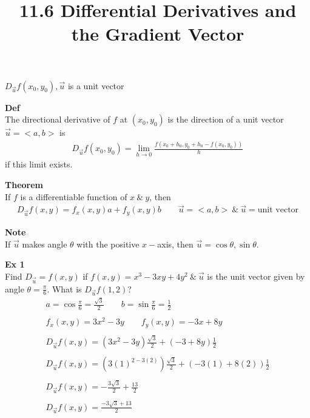 \documentclass{article}
\title{11.6 Differential Derivatives and the Gradient Vector}
\begin{document}
    \maketitle
    $ D_{\vec{u}} f(x_{0},y_{0}  ), \vec{u}$ is a unit vector

    \textbf{Def}\\
    The directional derivative of $ f $ at $ (x_{0},y_{0} ) $ is the direction of a unit vector $ \vec{u}=< a, b > $ is
    \[
        \begin{gathered}
          D_{\vec{u}} f(x_{0},y_{0} ) = \lim_{h \to 0} \frac{f(x_{0}+h_{0},y_{0}+h_{0}-f(x_{0},y_{0}))}{h}  
        \end{gathered}
    \]
    if this limit exists.

    \textbf{Theorem}\\
    If $ f $ is a differentiable function of $ x ~\&~ y $, then
    \[
        \begin{gathered}
        D_{\vec{u}}f(x,y) = f_{x}(x,y)a +f_{y}(x,y)b \qquad \vec{u}=< a, b > ~\&~ \vec{u}= \text{unit vector}    
        \end{gathered}
    \]
   
    \textbf{Note}\\
    If $ \vec{u} $ makes angle $ \theta $ with the positive $ x- $axis, then $ \vec{u}=\cos{\theta},\sin{\theta} $.

    \textbf{Ex 1}\\
    Find $ D_{\vec{u}}=f(x,y)$ if $ f(x,y) =x^{3}-3xy+4y^{2} ~\&~ \vec{u}$ is the unit vector given by angle $ \theta=\frac{\pi}{6} $. What is $ D_{\vec{u}}f(1,2)$?
    \[
        \begin{gathered}
        a=\cos{\frac{\pi}{6} }=\frac{\sqrt{3}}{2} \qquad b=\sin{\frac{\pi}{6} }=\frac{1}{2} \\
        ~\\
        f_{x}(x,y)=3x^{2}-3y \qquad f_{y}(x,y)=-3x+8y\\
        ~\\
        \boxed{D_{\vec{u}}f(x,y)=(3x^{2}-3y )\frac{\sqrt{3}}{2}+(-3+8y)\frac{1}{2}}\\
        ~\\
        D_{\vec{u}}f(x,y)=(3(1)^{2-3(2)})\frac{\sqrt{3} }{2}+(-3(1)+8(2))\frac{1}{2}\\
        ~\\
        D_{\vec{u}}f(x,y)=-\frac{3\sqrt{3}}{2} +\frac{13}{2}\\
        ~\\
        \boxed{D_{\vec{u}}f(x,y)=\frac{-3\sqrt{3}+13}{2}}  
        \end{gathered}
    \]
    
\end{document}

